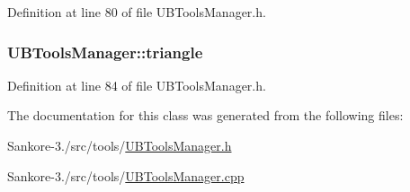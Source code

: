 Definition at line 80 of file U\-B\-Tools\-Manager.\-h.

\hypertarget{class_u_b_tools_manager_a44210809a60383e4a9f42f5c2c89ce6c}{
\subsubsection[{triangle}]{ U\-B\-Tools\-Manager\-::triangle}}\label{df/d8e/class_u_b_tools_manager_a44210809a60383e4a9f42f5c2c89ce6c}


Definition at line 84 of file U\-B\-Tools\-Manager.\-h.



The documentation for this class was generated from the following files\-:\begin{DoxyCompactItemize}
\item 
Sankore-\/3./src/tools/\hyperlink{_u_b_tools_manager_8h}{U\-B\-Tools\-Manager.\-h}\item 
Sankore-\/3./src/tools/\hyperlink{_u_b_tools_manager_8cpp}{U\-B\-Tools\-Manager.\-cpp}\end{DoxyCompactItemize}
